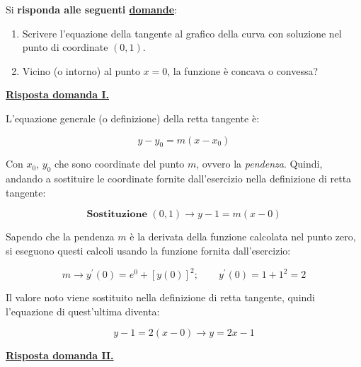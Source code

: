 \documentclass[a4paper]{article}
\begin{document}
	\noindent
	Si \textbf{risponda alle seguenti \underline{domande}}:
	
	\begin{enumerate}[label=\Roman*]
		\item Scrivere l'equazione della tangente al grafico della curva con soluzione nel punto di coordinate $\left(0, 1\right)$.
		
		\item Vicino (o intorno) al punto $x = 0$, la funzione è concava o convessa?
	\end{enumerate}
	
	\noindent
	\textcolor{Green4}{\textbf{\underline{Risposta domanda I.}}}\newline
	
	\noindent
	L'equazione generale (o definizione) della retta tangente è:
	
	\begin{equation*}
		y - y_{0} = m \left(x - x_{0}\right)
	\end{equation*}

	\noindent
	Con $x_{0}$, $y_{0}$ che sono coordinate del punto $m$, ovvero la \emph{pendenza}. Quindi, andando a sostituire le coordinate fornite dall'esercizio nella definizione di retta tangente:
	
	\begin{equation*}
		\textbf{Sostituzione } \left(0, 1\right) \rightarrow y - 1 = m \left(x - 0\right)
	\end{equation*}

	\noindent
	Sapendo che la pendenza $m$ è la derivata della funzione calcolata nel punto zero, si eseguono questi calcoli usando la funzione fornita dall'esercizio:
	
	\begin{equation*}
		m \longrightarrow y^{'}\left(0\right) = e^{0} + \left[y\left(0\right)\right]^{2}; \hspace{2em} y^{'}\left(0\right) = 1 + 1^{2} = 2
	\end{equation*}

	\noindent
	Il valore noto viene sostituito nella definizione di retta tangente, quindi l'equazione di quest'ultima diventa:
	
	\begin{equation*}
		y - 1 = 2\left(x - 0\right) \longrightarrow y = 2x - 1
	\end{equation*}\newline
	
	\noindent
	\textcolor{Green4}{\textbf{\underline{Risposta domanda II.}}}\newline
	
\end{document}
